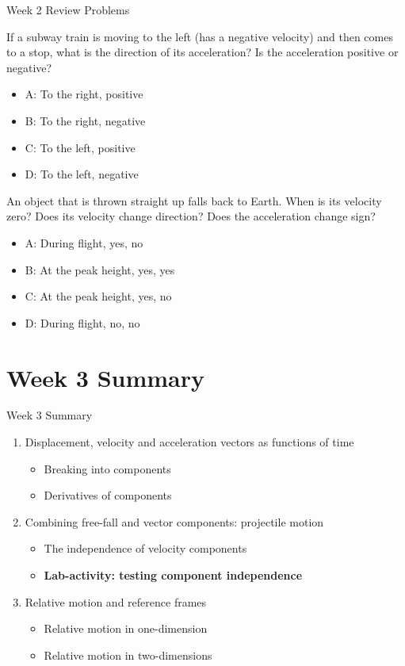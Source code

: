 \documentclass{beamer}
\begin{document}
\begin{frame}{Week 2 Review Problems}
\small
\begin{minipage}[b]{0.45\linewidth}
If a subway train is moving to the left (has a negative velocity) and then comes to a stop, what is the direction of its acceleration? Is the acceleration positive or negative?
\begin{itemize}
\vspace{0.5cm}
\item A: To the right, positive
\item B: To the right, negative
\item C: To the left, positive
\item D: To the left, negative
\end{itemize}
\end{minipage}
\hspace{0.5cm}
\begin{minipage}[b]{0.45\linewidth}
An object that is thrown straight up falls back to Earth.  When is its velocity zero?  Does its velocity change direction?  Does the acceleration change sign?
\begin{itemize}
\item A: During flight, yes, no
\item B: At the peak height, yes, yes
\item C: At the peak height, yes, no
\item D: During flight, no, no
\end{itemize}
\end{minipage}
\end{frame}

\section{Week 3 Summary}

\begin{frame}{Week 3 Summary}
\begin{enumerate}
\item Displacement, velocity and acceleration vectors \alert{as functions of time}
\begin{itemize}
\item Breaking into components
\item Derivatives of components
\end{itemize}
\item Combining free-fall and vector components: \alert{projectile motion}
\begin{itemize}
\item The independence of velocity components
\item \textbf{Lab-activity: testing component independence}
\end{itemize}
\item Relative motion and reference frames
\begin{itemize}
\item Relative motion in one-dimension
\item Relative motion in two-dimensions
\end{itemize}
\end{enumerate}
\end{frame}
\end{document}
